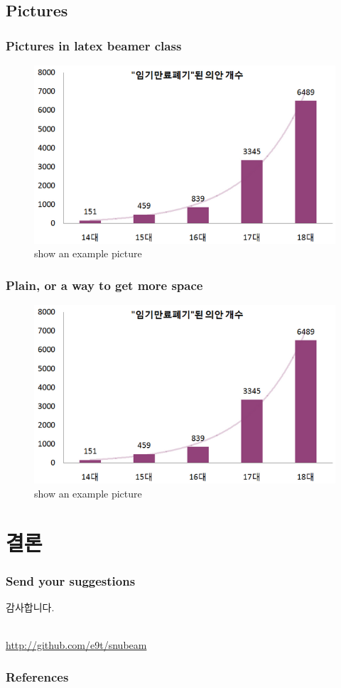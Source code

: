 \documentclass[compress]{beamer}
\begin{document}
\subsection{Pictures}
\begin{frame}\frametitle{Pictures in latex beamer class}
    \begin{figure}
        \includegraphics[scale=0.5]{images/graph.png}
        \caption{show an example picture}
    \end{figure}
\end{frame}
\begin{frame}[plain]
    \frametitle{Plain, or a way to get more space}
    \begin{figure}
        \includegraphics[scale=0.5]{images/graph.png}
        \caption{show an example picture}
    \end{figure}
\end{frame}


\section{결론}
\begin{frame}\frametitle{Send your suggestions}
    \vfill
    \begin{center}
        \begin{Huge}감사합니다.\end{Huge}\\
        \url{http://github.com/e9t/snubeam}
    \end{center}
    \vfill
\end{frame}

\begin{frame}[t, allowframebreaks]\frametitle{References}
    \nocite{*} %
    
\end{frame}
\end{document}
